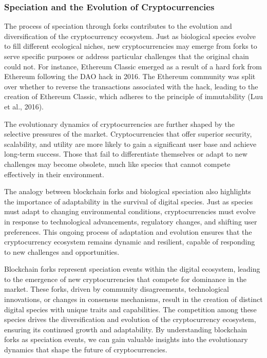 \documentclass[12pt,twoside]{article}
\begin{document}
\subsubsection{Speciation and the Evolution of Cryptocurrencies}

The process of speciation through forks contributes to the evolution and diversification of the cryptocurrency ecosystem. Just as biological species evolve to fill different ecological niches, new cryptocurrencies may emerge from forks to serve specific purposes or address particular challenges that the original chain could not. For instance, Ethereum Classic emerged as a result of a hard fork from Ethereum following the DAO hack in 2016. The Ethereum community was split over whether to reverse the transactions associated with the hack, leading to the creation of Ethereum Classic, which adheres to the principle of immutability (Luu et al., 2016).

The evolutionary dynamics of cryptocurrencies are further shaped by the selective pressures of the market. Cryptocurrencies that offer superior security, scalability, and utility are more likely to gain a significant user base and achieve long-term success. Those that fail to differentiate themselves or adapt to new challenges may become obsolete, much like species that cannot compete effectively in their environment.

The analogy between blockchain forks and biological speciation also highlights the importance of adaptability in the survival of digital species. Just as species must adapt to changing environmental conditions, cryptocurrencies must evolve in response to technological advancements, regulatory changes, and shifting user preferences. This ongoing process of adaptation and evolution ensures that the cryptocurrency ecosystem remains dynamic and resilient, capable of responding to new challenges and opportunities.

Blockchain forks represent speciation events within the digital ecosystem, leading to the emergence of new cryptocurrencies that compete for dominance in the market. These forks, driven by community disagreements, technological innovations, or changes in consensus mechanisms, result in the creation of distinct digital species with unique traits and capabilities. The competition among these species drives the diversification and evolution of the cryptocurrency ecosystem, ensuring its continued growth and adaptability. By understanding blockchain forks as speciation events, we can gain valuable insights into the evolutionary dynamics that shape the future of cryptocurrencies.
\end{document}
